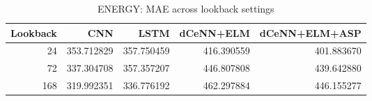 \begin{table}
\caption{ENERGY: MAE across lookback settings}
\begin{tabular}{rrrrr}
\toprule
Lookback & CNN & LSTM & dCeNN+ELM & dCeNN+ELM+ASP \\
\midrule
24 & 353.712829 & 357.750459 & 416.390559 & 401.883670 \\
72 & 337.304708 & 357.357207 & 446.807808 & 439.642880 \\
168 & 319.992351 & 336.776192 & 462.297884 & 446.155277 \\
\bottomrule
\end{tabular}
\end{table}
